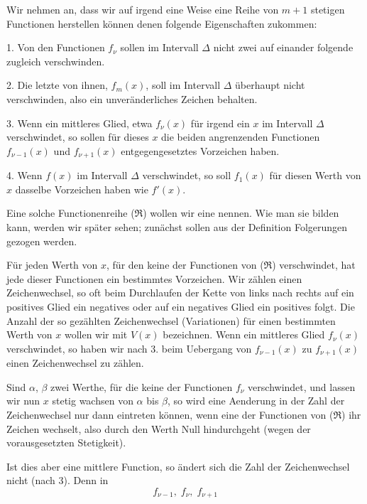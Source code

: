 Wir nehmen an, dass wir auf irgend eine Weise eine Reihe von $m + 1$ stetigen Functionen herstellen können
denen folgende Eigenschaften zukommen:

1. Von den Functionen $f_\nu$ sollen im Intervall $\Delta$ nicht zwei auf einander folgende zugleich verschwinden.

2. Die letzte von ihnen, $f_m(x)$, soll im Intervall $\Delta$ überhaupt nicht verschwinden, also ein unveränderliches Zeichen behalten.

3. Wenn ein mittleres Glied, etwa $f_\nu(x)$ für irgend ein $x$ im Intervall $\Delta$ verschwindet, so sollen für dieses $x$ die beiden angrenzenden Functionen $f_{\nu-1}(x)$ und $f_{\nu+1}(x)$ entgegengesetztes Vorzeichen haben.

4. Wenn $f(x)$ im Intervall $\Delta$ verschwindet, so soll $f_1(x)$ für diesen Werth von $x$ dasselbe Vorzeichen haben wie $f'(x)$.

Eine solche Functionenreihe ($\mathfrak{R}$) wollen wir eine  nennen. Wie man sie bilden kann, werden wir später sehen; zunächst sollen aus der Definition Folgerungen gezogen werden.

Für jeden Werth von $x$, für den keine der Functionen von ($\mathfrak{R}$) verschwindet, hat jede dieser Functionen ein bestimmtes Vorzeichen. Wir zählen einen Zeichenwechsel, so oft beim Durchlaufen der Kette von links nach rechts auf ein positives Glied ein negatives oder auf ein negatives Glied ein positives folgt. Die Anzahl der so gezählten Zeichenwechsel (Variationen) für einen bestimmten Werth von $x$ wollen wir mit $V(x)$ bezeichnen. Wenn ein mittleres Glied $f_\nu(x)$ verschwindet, so haben wir nach 3. beim Uebergang von $f_{\nu-1}(x)$ zu $f_{\nu+1}(x)$ einen Zeichenwechsel zu zählen.

Sind $\alpha$, $\beta$ zwei Werthe, für die keine der Functionen $f_\nu$ verschwindet, und lassen wir nun $x$ stetig wachsen von $\alpha$ bis $\beta$, so wird eine Aenderung in der Zahl der Zeichenwechsel nur dann eintreten können, wenn eine der Functionen von ($\mathfrak{R}$) ihr Zeichen wechselt, also durch den Werth Null hindurchgeht (wegen der vorausgesetzten Stetigkeit).

Ist dies aber eine mittlere Function, so ändert sich die Zahl der Zeichenwechsel nicht (nach 3). Denn in
\[
f_{\nu-1}, \; f_\nu, \; f_{\nu+1}
\]
